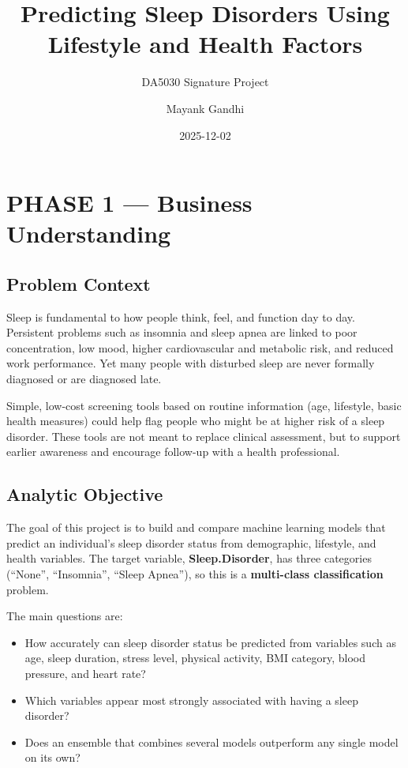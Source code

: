 \documentclass[
]{article}
\title{Predicting Sleep Disorders Using Lifestyle and Health Factors}
\subtitle{DA5030 Signature Project}
\author{Mayank Gandhi}
\date{2025-12-02}
\providecommand{\tightlist}{%
  \setlength{\itemsep}{0pt}\setlength{\parskip}{0pt}}
\begin{document}
\maketitle

{
\setcounter{tocdepth}{3}
\tableofcontents
}
\section{\texorpdfstring{\textbf{PHASE 1 --- Business
Understanding}}{PHASE 1 --- Business Understanding}}\label{phase-1-business-understanding}

\subsection{Problem Context}\label{problem-context}

Sleep is fundamental to how people think, feel, and function day to day.
Persistent problems such as insomnia and sleep apnea are linked to poor
concentration, low mood, higher cardiovascular and metabolic risk, and
reduced work performance. Yet many people with disturbed sleep are never
formally diagnosed or are diagnosed late.

Simple, low-cost screening tools based on routine information (age,
lifestyle, basic health measures) could help flag people who might be at
higher risk of a sleep disorder. These tools are not meant to replace
clinical assessment, but to support earlier awareness and encourage
follow-up with a health professional.

\subsection{Analytic Objective}\label{analytic-objective}

The goal of this project is to build and compare machine learning models
that predict an individual's sleep disorder status from demographic,
lifestyle, and health variables. The target variable,
\textbf{Sleep.Disorder}, has three categories (``None'', ``Insomnia'',
``Sleep Apnea''), so this is a \textbf{multi-class classification}
problem.

The main questions are:

\begin{itemize}
\tightlist
\item
  How accurately can sleep disorder status be predicted from variables
  such as age, sleep duration, stress level, physical activity, BMI
  category, blood pressure, and heart rate?\\
\item
  Which variables appear most strongly associated with having a sleep
  disorder?\\
\item
  Does an ensemble that combines several models outperform any single
  model on its own?
\end{itemize}
\end{document}
